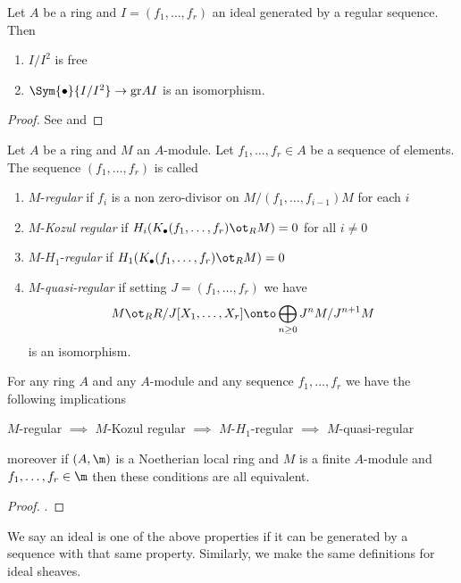 \documentclass[12pt]{article}
\begin{document}
\begin{prop}
Let $A$ be a ring and $I = (f_1, \dots, f_r)$ an ideal generated by a regular sequence. Then 
\begin{enumerate}
\item $I / I^2$ is free
\item $\Sym{\bullet}{I/I^2} \to \gr{A}{I}$ is an isomorphism.
\end{enumerate}
\end{prop}

\begin{proof}
See \chref{} and 
\end{proof}

\begin{defn}
Let $A$ be a ring and $M$ an $A$-module. Let $f_1, \dots, f_r \in A$ be a sequence of elements. The sequence $(f_1, \dots, f_r)$ is called
\begin{enumerate}
\item $M$-\textit{regular} if $f_i$ is a non zero-divisor on $M / (f_1, \dots, f_{i-1}) M$ for each $i$
\item $M$-\textit{Kozul regular} if $H_i(K_\bullet(f_1, \dots, f_r) \ot_R M) = 0$ for all $i \neq 0$
\item $M$-$H_1$-\textit{regular} if $H_1(K_\bullet(f_1, \dots, f_r) \ot_R M) = 0$ 
\item $M$-\textit{quasi-regular} if setting $J = (f_1, \dots, f_r)$ we have
\[ M \ot_R R/J[X_1, \dots, X_r] \onto \bigoplus_{n \ge 0} J^n M / J^{n+1} M \]
is an isomorphism.
\end{enumerate}
\end{defn}

\begin{lemma}
For any ring $A$ and any $A$-module and any sequence $f_1, \dots, f_r$ we have the following implications
\begin{center}
$M$-regular $\implies$ $M$-Kozul regular $\implies$ $M$-$H_1$-regular $\implies$ $M$-quasi-regular
\end{center}
moreover if $(A, \m)$ is a Noetherian local ring and $M$ is a finite $A$-module and $f_1, \dots, f_r \in \m$ then these conditions are all equivalent.  
\end{lemma}

\begin{proof}
.
\end{proof}

\begin{defn}
We say an ideal is one of the above properties if it can be generated by a sequence with that same property. Similarly, we make the same definitions for ideal sheaves.
\end{defn}
\end{document}
